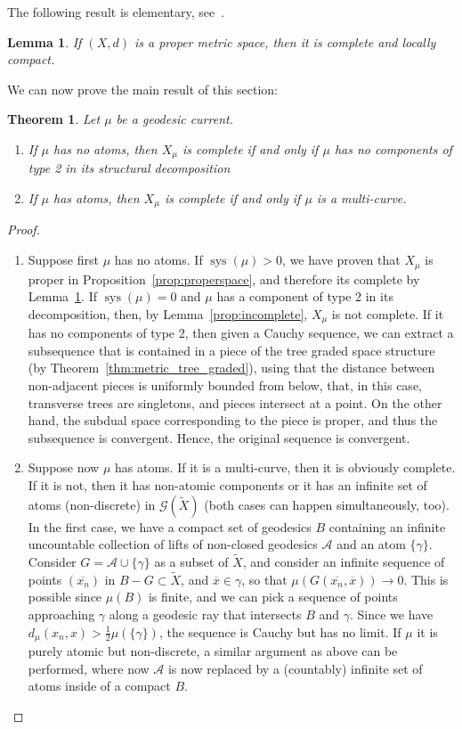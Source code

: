 \documentclass[12pt,article]{amsart}
\numberwithin{equation}{section}
\numberwithin{figure}{section}
\newtheorem{theorem}[equation]{Theorem}
\newtheorem{lemma}[equation]{Lemma}
\theoremstyle{definition}
\theoremstyle{plain}
\newcommand\G{\ensuremath{\mathcal{G}}}
\DeclareMathOperator{\sys}{sys}
\newcommand*{\wt}[1]{\widetilde{#1}}
\begin{document}
The following result is elementary, see~\cite[Chapter I.3, Corollary~3.8]{BH11:NonPosCurvature}.
\begin{lemma}
If $(X,d)$ is a proper metric space, then it is complete and locally compact.
\label{thm:hopfrinow}
\end{lemma}
We can now prove the main result of this section:
\begin{theorem} Let $\mu$ be a geodesic current.
\label{thm:new_completeness}
\begin{enumerate}
    \item  If $\mu$ has no atoms, then
    $X_\mu$ is complete if and only if $\mu$ has no components of type 2 in its structural decomposition
    \item If $\mu$ has atoms, then $X_{\mu}$ is complete if and only if $\mu$ is a multi-curve.
\end{enumerate}
\end{theorem}
\begin{proof}
\begin{enumerate}
\item Suppose first $\mu$ has no atoms. If $\sys(\mu)>0$, we have proven that $X_{\mu}$ is proper in Proposition~\ref{prop:properspace}, and therefore its complete by Lemma~\ref{thm:hopfrinow}. If $\sys(\mu)=0$ and $\mu$ has a component of type 2 in its decomposition, then, by Lemma~\ref{prop:incomplete}, $X_{\mu}$ is not complete. If it has no components of type 2, then given a Cauchy sequence, we can extract a subsequence that is contained in a piece of the tree graded space structure (by Theorem~\ref{thm:metric_tree_graded}), using that the distance between non-adjacent pieces is uniformly bounded from below, that, in this case, transverse trees are singletons, and pieces intersect at a point. On the other hand, the subdual space corresponding to the piece is proper, and thus the subsequence is convergent. Hence, the original sequence is convergent.
    \item Suppose now $\mu$ has atoms. If it is a multi-curve, then it is obviously complete.
    If it is not, then it has non-atomic components or it has an infinite set of atoms (non-discrete) in $\G(\wt{X})$ (both cases can happen simultaneously, too).
    In the first case, we have a compact set of geodesics $B$ containing an infinite uncountable collection of lifts of non-closed geodesics $\mathcal{A}$ and an atom $\{ \gamma \}$. 
    Consider  $G=\mathcal{A} \cup\{ \gamma \}$ as a subset of $\wt{X}$, and consider an infinite sequence of points $(\overline{x_n})$ in $B-G \subset \wt{X}$, and $\overline{x} \in \gamma$, so that $\mu(G(\overline{x_n},\overline{x})) \to 0$. This is possible since $\mu(B)$ is finite, and we can pick a sequence of points approaching $\gamma$ along a geodesic ray that intersects $B$ and $\gamma$. Since we have $d_{\mu}(x_n, x)>\frac{1}{2}\mu(\{ \gamma \})$, the sequence is Cauchy but has no limit.
    If $\mu$ it is purely atomic but non-discrete, a similar argument as above can be performed, where now $\mathcal{A}$ is now replaced by a (countably) infinite set of atoms inside of a compact $B$.
\end{enumerate}
\end{proof}
\end{document}
